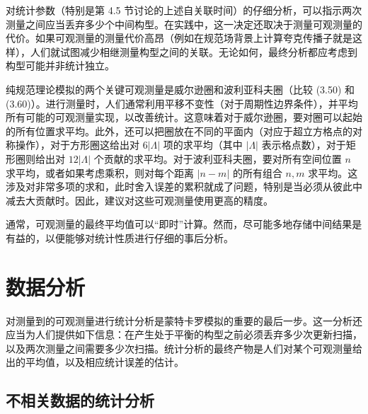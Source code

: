 对统计参数（特别是第 4.5 节讨论的上述自关联时间）的仔细分析，可以指示两次测量之间应当丢弃多少个中间构型。在实践中，这一决定还取决于测量可观测量的代价。如果可观测量的测量代价高昂（例如在规范场背景上计算夸克传播子就是这样），人们就试图减少相继测量构型之间的关联。无论如何，最终分析都应考虑到构型可能并非统计独立。

纯规范理论模拟的两个关键可观测量是威尔逊圈和波利亚科夫圈（比较 (3.50) 和 (3.60)）。进行测量时，人们通常利用平移不变性（对于周期性边界条件），并平均所有可能的可观测量实现，以改善统计。这意味着对于威尔逊圈，要对圈可以起始的所有位置求平均。此外，还可以把圈放在不同的平面内（对应于超立方格点的对称操作），对于方形圈这给出对 $6|\Lambda|$ 项的求平均（其中 $|\Lambda|$ 表示格点数），对于矩形圈则给出对 $12|\Lambda|$ 个贡献的求平均。对于波利亚科夫圈，要对所有空间位置 $n$ 求平均，或者如果考虑乘积，则对每个距离 $|n - m|$ 的所有组合 $n, m$ 求平均。这涉及对非常多项的求和，此时舍入误差的累积就成了问题，特别是当必须从彼此中减去大贡献时。因此，建议对这些可观测量使用更高的精度。

通常，可观测量的最终平均值可以“即时”计算。然而，尽可能多地存储中间结果是有益的，以便能够对统计性质进行仔细的事后分析。

\section{数据分析}

对测量到的可观测量进行统计分析是蒙特卡罗模拟的重要的最后一步。这一分析还应当为人们提供如下信息：在产生处于平衡的构型之前必须丢弃多少次更新扫描，以及两次测量之间需要多少次扫描。统计分析的最终产物是人们对某个可观测量给出的平均值，以及相应统计误差的估计。

\subsection{不相关数据的统计分析}

